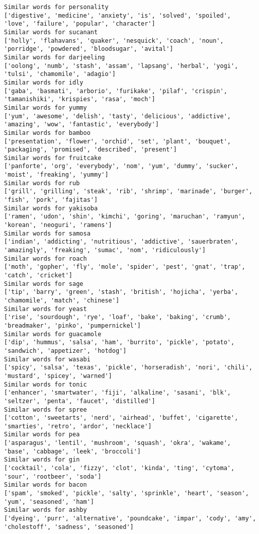 \documentclass[11pt]{article}
\begin{document}
\begin{Verbatim}[commandchars=\\\{\}]
Similar words for personality
['digestive', 'medicine', 'anxiety', 'is', 'solved', 'spoiled', 'love', 'failure', 'popular', 'character']
Similar words for sucanant
['holly', 'flahavans', 'quaker', 'nesquick', 'coach', 'noun', 'porridge', 'powdered', 'bloodsugar', 'avital']
Similar words for darjeeling
['oolong', 'numb', 'stash', 'assam', 'lapsang', 'herbal', 'yogi', 'tulsi', 'chamomile', 'adagio']
Similar words for idly
['gaba', 'basmati', 'arborio', 'furikake', 'pilaf', 'crispin', 'tamanishiki', 'krispies', 'rasa', 'moch']
Similar words for yummy
['yum', 'awesome', 'delish', 'tasty', 'delicious', 'addictive', 'amazing', 'wow', 'fantastic', 'everybody']
Similar words for bamboo
['presentation', 'flower', 'orchid', 'set', 'plant', 'bouquet', 'packaging', 'promised', 'described', 'present']
Similar words for fruitcake
['panforte', 'org', 'everybody', 'nom', 'yum', 'dummy', 'sucker', 'moist', 'freaking', 'yummy']
Similar words for rub
['grill', 'grilling', 'steak', 'rib', 'shrimp', 'marinade', 'burger', 'fish', 'pork', 'fajitas']
Similar words for yakisoba
['ramen', 'udon', 'shin', 'kimchi', 'goring', 'maruchan', 'ramyun', 'korean', 'neoguri', 'ramens']
Similar words for samosa
['indian', 'addicting', 'nutritious', 'addictive', 'sauerbraten', 'amazingly', 'freaking', 'sumac', 'nom', 'ridiculously']
Similar words for roach
['moth', 'gopher', 'fly', 'mole', 'spider', 'pest', 'gnat', 'trap', 'catch', 'cricket']
Similar words for sage
['tip', 'barry', 'green', 'stash', 'british', 'hojicha', 'yerba', 'chamomile', 'match', 'chinese']
Similar words for yeast
['rise', 'sourdough', 'rye', 'loaf', 'bake', 'baking', 'crumb', 'breadmaker', 'pinko', 'pumpernickel']
Similar words for guacamole
['dip', 'hummus', 'salsa', 'ham', 'burrito', 'pickle', 'potato', 'sandwich', 'appetizer', 'hotdog']
Similar words for wasabi
['spicy', 'salsa', 'texas', 'pickle', 'horseradish', 'nori', 'chili', 'mustard', 'spicey', 'warned']
Similar words for tonic
['enhancer', 'smartwater', 'fiji', 'alkaline', 'sasani', 'blk', 'seltzer', 'penta', 'faucet', 'distilled']
Similar words for spree
['cotton', 'sweetarts', 'nerd', 'airhead', 'buffet', 'cigarette', 'smarties', 'retro', 'ardor', 'necklace']
Similar words for pea
['asparagus', 'lentil', 'mushroom', 'squash', 'okra', 'wakame', 'base', 'cabbage', 'leek', 'broccoli']
Similar words for gin
['cocktail', 'cola', 'fizzy', 'clot', 'kinda', 'ting', 'cytoma', 'sour', 'rootbeer', 'soda']
Similar words for bacon
['spam', 'smoked', 'pickle', 'salty', 'sprinkle', 'heart', 'season', 'yum', 'seasoned', 'ham']
Similar words for ashby
['dyeing', 'purr', 'alternative', 'poundcake', 'impar', 'cody', 'amy', 'cholestoff', 'sadness', 'seasoned']

\end{Verbatim}
\end{document}
